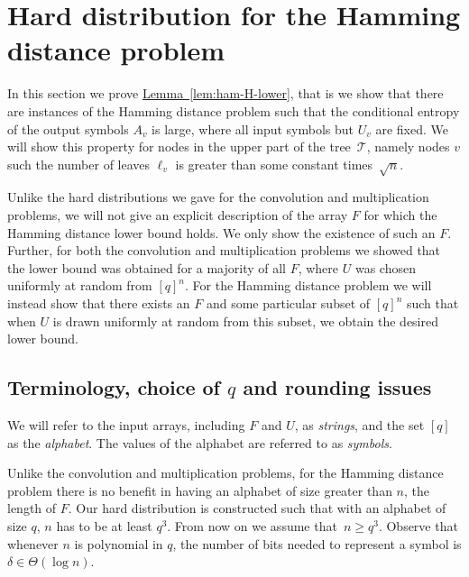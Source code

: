 \documentclass[11pt]{article}
\numberwithin{equation}{section}
\theoremstyle{definition}
\theoremstyle{plain}
\newcommand{\expref}[2]{\hyperref[#2]{#1~\ref{#2}}}
\newcommand{\calT}{\ensuremath{\mathcal{T}}}
\newcommand{\Xv}{\ensuremath{U_v}}
\newcommand{\Yv}{\ensuremath{A_v}}
\begin{document}
%
%
%
%
%
%
%
%
%
%



%



%





\section{Hard distribution for the Hamming distance problem} \label{sec:ham}

In this section we prove \expref{Lemma}{lem:ham-H-lower}, that is we show that there are instances of the Hamming distance problem such that the conditional entropy of the output symbols $\Yv$ is large, where all input symbols but $\Xv$ are fixed.
We will show this property for nodes in the upper part of the tree~$\calT$, namely nodes $v$ such the number of leaves $\ell_v$ is greater than some constant times~$\sqrt{n}$. 

Unlike the hard distributions we gave for the convolution and multiplication problems, we will not give an explicit description of the array $F$ for which the Hamming distance lower bound holds. We only show the existence of such an $F$.
Further, for both the convolution and multiplication problems we showed that the lower bound was obtained for a majority of all $F$, where $U$ was chosen uniformly at random from $[q]^n$.
For the Hamming distance problem we will instead show that there exists an $F$ and some particular subset of $[q]^n$ such that when $U$ is drawn uniformly at random from this subset, we obtain the desired lower bound.

\subsection{Terminology, choice of \texorpdfstring{$q$}{q} and rounding issues} \label{sec:rounding}

We will refer to the input arrays, including $F$ and $U$, as \emph{strings}, and the set $[q]$ as the \emph{alphabet}. The values of the alphabet are referred to as \emph{symbols}.

Unlike the convolution and multiplication problems, for the Hamming distance problem there is no benefit in having an alphabet
of    %
size greater
than  %
$n$, the length of $F$.
Our hard distribution is constructed such that with an alphabet of size $q$, $n$ has to be at least $q^3$.
{}From now on we assume that~$n\geq q^3$.
Observe that whenever $n$ is polynomial in $q$, the number of bits needed to represent a symbol is $\delta\in\Theta(\log n)$.
\end{document}
